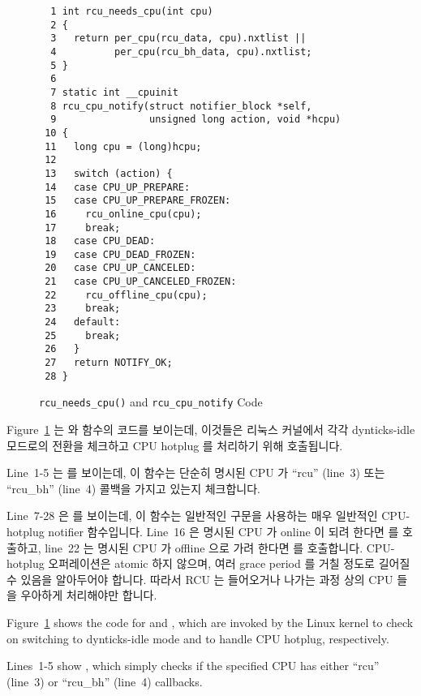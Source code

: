 \begin{figure}[tbp]
{ \scriptsize
\begin{verbatim}
  1 int rcu_needs_cpu(int cpu)
  2 {
  3   return per_cpu(rcu_data, cpu).nxtlist ||
  4          per_cpu(rcu_bh_data, cpu).nxtlist;
  5 }
  6
  7 static int __cpuinit
  8 rcu_cpu_notify(struct notifier_block *self,
  9                unsigned long action, void *hcpu)
 10 {
 11   long cpu = (long)hcpu;
 12
 13   switch (action) {
 14   case CPU_UP_PREPARE:
 15   case CPU_UP_PREPARE_FROZEN:
 16     rcu_online_cpu(cpu);
 17     break;
 18   case CPU_DEAD:
 19   case CPU_DEAD_FROZEN:
 20   case CPU_UP_CANCELED:
 21   case CPU_UP_CANCELED_FROZEN:
 22     rcu_offline_cpu(cpu);
 23     break;
 24   default:
 25     break;
 26   }
 27   return NOTIFY_OK;
 28 }
\end{verbatim}
}
\caption{{\tt rcu\_needs\_cpu()} and {\tt rcu\_cpu\_notify}  Code}
\label{fig:app:rcuimpl:rcutreewt:Code for rcu-needs-cpu and rcu-cpu-notify}
\end{figure}

Figure~\ref{fig:app:rcuimpl:rcutreewt:Code for rcu-needs-cpu and rcu-cpu-notify}
는  와  함수의 코드를 보이는데,
이것들은 리눅스 커널에서 각각 dynticks-idle 모드로의 전환을 체크하고 CPU
hotplug 를 처리하기 위해 호출됩니다.

Line~1-5 는  를 보이는데, 이 함수는 단순히 명시된 CPU 가
``rcu'' (line~3) 또는 ``rcu\_bh'' (line~4) 콜백을 가지고 있는지 체크합니다.

Line~7-28 은  를 보이는데, 이 함수는 일반적인 
구문을 사용하는 매우 일반적인 CPU-hotplug notifier 함수입니다.
Line~16 은 명시된 CPU 가 online 이 되려 한다면  를
호출하고, line~22 는 명시된 CPU 가 offline 으로 가려 한다면
 를 호출합니다.
CPU-hotplug 오퍼레이션은 atomic 하지 않으며, 여러 grace period 를 거칠 정도로
길어질 수 있음을 알아두어야 합니다.
따라서 RCU 는 들어오거나 나가는 과정 상의 CPU 들을 우아하게 처리해야만 합니다.
\iffalse

Figure~\ref{fig:app:rcuimpl:rcutreewt:Code for rcu-needs-cpu and rcu-cpu-notify}
shows the code for  and ,
which are invoked by the Linux kernel to check on switching to
dynticks-idle mode and to handle CPU hotplug, respectively.

Lines~1-5 show , which simply checks if the specified
CPU has either ``rcu'' (line~3) or ``rcu\_bh'' (line~4) callbacks.

